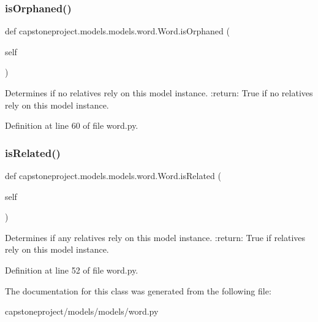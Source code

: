 \subsubsection{\texorpdfstring{is\+Orphaned()}{isOrphaned()}}
{\footnotesize\ttfamily def capstoneproject.\+models.\+models.\+word.\+Word.\+is\+Orphaned (\begin{DoxyParamCaption}\item[{}]{self }\end{DoxyParamCaption})}

\begin{DoxyVerb}Determines if no relatives rely on this model instance.
:return: True if no relatives rely on this model instance.
\end{DoxyVerb}
 

Definition at line 60 of file word.\+py.

\mbox{\label{classcapstoneproject_1_1models_1_1models_1_1word_1_1_word_a6f831976b471d46e49404bceb2e591e9}} 
\subsubsection{\texorpdfstring{is\+Related()}{isRelated()}}
{\footnotesize\ttfamily def capstoneproject.\+models.\+models.\+word.\+Word.\+is\+Related (\begin{DoxyParamCaption}\item[{}]{self }\end{DoxyParamCaption})}

\begin{DoxyVerb}Determines if any relatives rely on this model instance.
:return: True if relatives rely on this model instance.
\end{DoxyVerb}
 

Definition at line 52 of file word.\+py.



The documentation for this class was generated from the following file\+:\begin{DoxyCompactItemize}
\item 
capstoneproject/models/models/word.\+py\end{DoxyCompactItemize}

